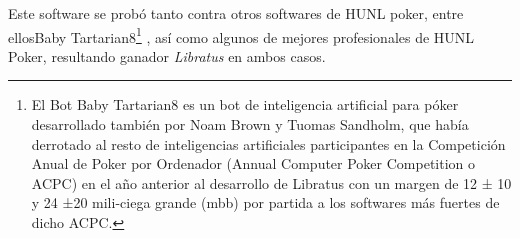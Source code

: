 Este software se probó tanto contra otros softwares de HUNL poker, entre ellosBaby Tartarian8\footnote{El Bot Baby Tartarian8 es un bot de inteligencia artificial para póker desarrollado también por Noam Brown y Tuomas Sandholm, que había derrotado al resto de inteligencias artificiales participantes en la Competición Anual de Poker por Ordenador (Annual Computer Poker Competition o ACPC) en el año anterior al desarrollo de Libratus con un margen de 12 ± 10 y 24 ±20 mili-ciega grande (mbb) por partida a los softwares más fuertes de dicho ACPC.} , así como algunos de mejores profesionales de HUNL Poker, resultando ganador \textit{Libratus} en ambos casos. \cite{libratusScience2, libratusScience}

